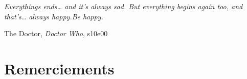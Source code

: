 \documentclass[../main/main.tex]{subfiles}
\begin{document}
\thispagestyle{empty}
\vspace*{\fill}
\epigraph{\openquote\textit{Everythings ends… and it's always sad. But
        everything begins again too, and that's… always happy.\smallbreak Be
happy.\closequote}}{The Doctor, \textit{Doctor Who}, s10e00}
\vspace*{\fill}

\chapter*{Remerciements}
\end{document}
